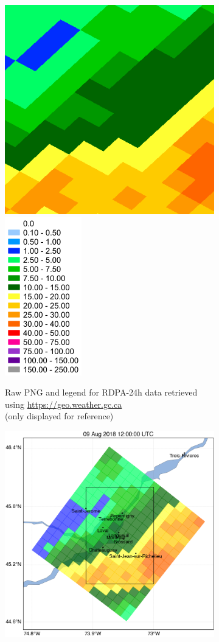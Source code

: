 \documentclass[10pt,a4paper,titlepage,parskip]{scrartcl}
\begin{document}
\begin{figure}[h]
	\begin{subfigure}[b]{0.45\textwidth}
		\centering
		\includegraphics[height=0.58\linewidth]{figures/test-map-geomet-geo-weather-rdpa24_2018080912.png}
		\hspace*{0.5cm}
		\includegraphics[height=0.58\linewidth]{figures/test-map-geomet-geo-weather-rdpa24_legend.png}
		\caption{Raw PNG and legend for RDPA-24h data retrieved using \url{https://geo.weather.gc.ca}\\(only displayed for reference)}
		\label{fig:plot_example:geo-weather}
	\end{subfigure}
	\hspace*{0.05\textwidth}
	\begin{subfigure}[b]{0.45\textwidth}
		\centering
		\includegraphics[height=0.58\linewidth]{figures/test-map-geomet-nrcan-hfe-rdpa24_2018080912.png}

\end{subfigure}
\end{figure}
\end{document}
